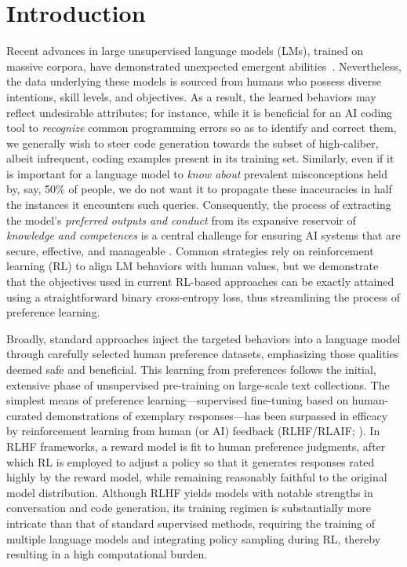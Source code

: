 \section{Introduction}
Recent advances in large unsupervised language models (LMs), trained on massive corpora, have demonstrated unexpected emergent abilities~\citep{chowdhery2022palm, brown2020language, touvron2023llama,bubeck2023sparks}. Nevertheless, the data underlying these models is sourced from humans who possess diverse intentions, skill levels, and objectives. As a result, the learned behaviors may reflect undesirable attributes; for instance, while it is beneficial for an AI coding tool to \textit{recognize} common programming errors so as to identify and correct them, we generally wish to steer code generation towards the subset of high-caliber, albeit infrequent, coding examples present in its training set. Similarly, even if it is important for a language model to \textit{know about} prevalent misconceptions held by, say, 50\% of people, we do not want it to propagate these inaccuracies in half the instances it encounters such queries. Consequently, the process of extracting the model’s \emph{preferred outputs and conduct} from its expansive reservoir of \textit{knowledge and competences} is a central challenge for ensuring AI systems that are secure, effective, and manageable \citep{ouyang2022training}. Common strategies rely on reinforcement learning (RL) to align LM behaviors with human values, but we demonstrate that the objectives used in current RL-based approaches can be exactly attained using a straightforward binary cross-entropy loss, thus streamlining the process of preference learning.

Broadly, standard approaches inject the targeted behaviors into a language model through carefully selected human preference datasets, emphasizing those qualities deemed safe and beneficial. This learning from preferences follows the initial, extensive phase of unsupervised pre-training on large-scale text collections. The simplest means of preference learning—supervised fine-tuning based on human-curated demonstrations of exemplary responses—has been surpassed in efficacy by reinforcement learning from human (or AI) feedback (RLHF/RLAIF; \citep{christiano2017deep,bai2022constitutional}). In RLHF frameworks, a reward model is fit to human preference judgments, after which RL is employed to adjust a policy so that it generates responses rated highly by the reward model, while remaining reasonably faithful to the original model distribution. Although RLHF yields models with notable strengths in conversation and code generation, its training regimen is substantially more intricate than that of standard supervised methods, requiring the training of multiple language models and integrating policy sampling during RL, thereby resulting in a high computational burden.

